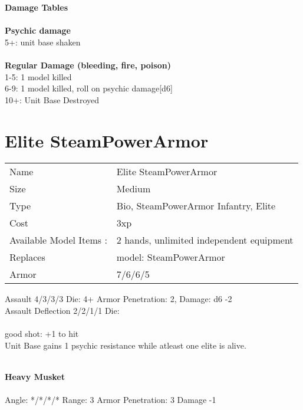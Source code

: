 {\bf Damage Tables} \\
\ \\ {\bf Psychic damage } \\
5+: unit base shaken \\
\ \\ {\bf Regular Damage (bleeding, fire, poison) } \\
1-5: 1 model killed \\
6-9: 1 model killed, roll on psychic damage[d6] \\
10+: Unit Base Destroyed \\









\pagebreak

\section{ Elite SteamPowerArmor }

\begin{tabular}{ll}
  Name & Elite SteamPowerArmor \\
  Size & Medium\\
  Type & Bio, SteamPowerArmor Infantry, Elite\\
  Cost & 3xp\\
  Available Model Items : &2 hands, unlimited independent equipment\\
  Replaces & model: SteamPowerArmor\\
  Armor & 7/6/6/5
\end{tabular}



Assault 4/3/3/3 Die: 4+ Armor Penetration: 2, Damage: d6 -2 \\
Assault Deflection 2/2/1/1 Die: \\

\ \\

good shot: +1 to hit \\ Unit Base gains 1 psychic resistance while atleast one elite is alive.

\ \\
{\bf Heavy Musket } \\
\ \\
Angle: */*/*/* Range: 3 Armor Penetration: 3 Damage -1 \\
\indent  \\





